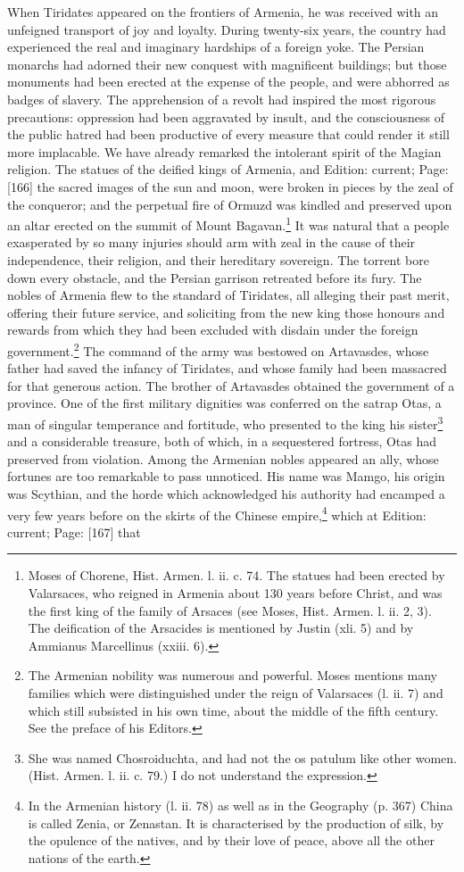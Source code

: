 When Tiridates appeared on the frontiers of Armenia, he was received with an unfeigned transport of joy and loyalty. During twenty-six years, the country had experienced the real and imaginary hardships of a foreign yoke. The Persian monarchs had adorned their new conquest with magnificent buildings; but those monuments had been erected at the expense of the people, and were abhorred as badges of slavery. The apprehension of a revolt had inspired the most rigorous precautions: oppression had been aggravated by insult, and the consciousness of the public hatred had been productive of every measure that could render it still more implacable. We have already remarked the intolerant spirit of the Magian religion. The statues of the deified kings of Armenia, and Edition: current; Page: [166] the sacred images of the sun and moon, were broken in pieces by the zeal of the conqueror; and the perpetual fire of Ormuzd was kindled and preserved upon an altar erected on the summit of Mount Bagavan.\footnote{Moses of Chorene, Hist. Armen. l. ii. c. 74. The statues had been erected by Valarsaces, who reigned in Armenia about 130 years before Christ, and was the first king of the family of Arsaces (see Moses, Hist. Armen. l. ii. 2, 3). The deification of the Arsacides is mentioned by Justin (xli. 5) and by Ammianus Marcellinus (xxiii. 6).} It was natural that a people exasperated by so many injuries should arm with zeal in the cause of their independence, their religion, and their hereditary sovereign. The torrent bore down every obstacle, and the Persian garrison retreated before its fury. The nobles of Armenia flew to the standard of Tiridates, all alleging their past merit, offering their future service, and soliciting from the new king those honours and rewards from which they had been excluded with disdain under the foreign government.\footnote{The Armenian nobility was numerous and powerful. Moses mentions many families which were distinguished under the reign of Valarsaces (l. ii. 7) and which still subsisted in his own time, about the middle of the fifth century. See the preface of his Editors.} The command of the army was bestowed on Artavasdes, whose father had saved the infancy of Tiridates, and whose family had been massacred for that generous action. The brother of Artavasdes obtained the government of a province. One of the first military dignities was conferred on the satrap Otas, a man of singular temperance and fortitude, who presented to the king his sister\footnote{She was named Chosroiduchta, and had not the os patulum like other women. (Hist. Armen. l. ii. c. 79.) I do not understand the expression.} and a considerable treasure, both of which, in a sequestered fortress, Otas had preserved from violation. Among the Armenian nobles appeared an ally, whose fortunes are too remarkable to pass unnoticed. His name was Mamgo, his origin was Scythian, and the horde which acknowledged his authority had encamped a very few years before on the skirts of the Chinese empire,\footnote{In the Armenian history (l. ii. 78) as well as in the Geography (p. 367) China is called Zenia, or Zenastan. It is characterised by the production of silk, by the opulence of the natives, and by their love of peace, above all the other nations of the earth.} which at Edition: current; Page: [167] that 